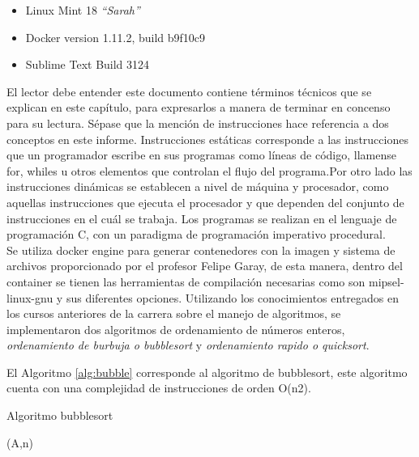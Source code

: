\documentclass{memoria}
\begin{document}
\begin{itemize}
\item Linux Mint 18 \emph{“Sarah”} \cite{mint}
\item Docker version 1.11.2, build b9f10c9 \cite{docker}
\item Sublime Text Build 3124 \cite{sublime}
\end{itemize}
El lector debe entender este documento contiene términos técnicos que se explican en este capítulo, para expresarlos a manera de terminar en concenso para su lectura.
Sépase que la mención de instrucciones hace referencia a dos conceptos en este informe. Instrucciones estáticas corresponde a las instrucciones que un programador escribe en sus programas como líneas de código, llamense for, whiles u otros elementos que controlan el flujo del programa.Por otro lado las instrucciones dinámicas se establecen a nivel de máquina y procesador, como aquellas instrucciones que ejecuta el procesador y que dependen del conjunto de instrucciones en el cuál se trabaja.
Los programas se realizan en el lenguaje de programación C, con un paradigma de programación imperativo procedural.\\
Se utiliza docker engine para generar contenedores con la imagen y sistema de archivos proporcionado por el profesor Felipe Garay, de esta manera, dentro del container se tienen las herramientas de compilación necesarias como son mipsel-linux-gnu y sus diferentes opciones.
Utilizando los conocimientos entregados en los cursos anteriores de la  carrera sobre el manejo de algoritmos, se implementaron dos algoritmos de ordenamiento de números enteros, \emph{ordenamiento de burbuja o bubblesort} y \emph{ordenamiento rapido o quicksort}.

El Algoritmo \ref{alg:bubble} corresponde al algoritmo de bubblesort, este algoritmo cuenta con una complejidad de instrucciones de orden O(n2).\cite{wiki:bubble}

\begin{algorithm}
\caption{Algoritmo bubblesort}\label{alg:bubble}
\bubblesort(A,n)
\end{algorithm}
\end{document}
